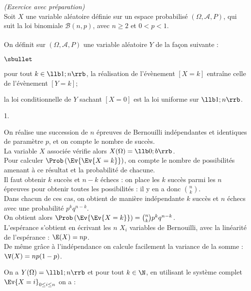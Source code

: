 \documentclass[11pt]{article}%
\begin{document}
 \newpage

 \begin{exercice}{\it (Exercice avec préparation)}~\\
 Soit $X$ une variable aléatoire définie sur un espace probabilisé
$(\Omega, \mathcal{A}, P)$, qui suit la loi binomiale $\mathcal{B} (n,
p)$, avec $n \geq 2$ et $0 < p < 1$. \\
\\
 On définit sur $(\Omega, \mathcal{A}, P)$ une variable aléatoire $Y$
de la façon suivante : \\
 \begin{noliste}{$\sbullet$}
 \item pour tout $k \in \llb 1 ; n \rrb$, la réalisation de l'évènement
$[X = k]$ entraîne celle de l'évènement $[Y = k]$;
 \item la loi conditionnelle de $Y$ sachant $[X = 0]$ est la loi
uniforme sur $\llb 1 ; n \rrb$.
 \end{noliste}
 \begin{noliste}{1.}
 \setlength{\itemsep}{4mm}
 \item On réalise une succession de $n$ épreuves de Bernouilli
indépendantes et identiques de paramètre $p$, et on compte le nombre de
succès. \\
 La variable $X$ associée vérifie alors $X(\Omega) = \llb 0 ; b \rrb$.
\\
 Pour calculer $\Prob\left(\Ev{\Ev{X = k}}\right)$, on compte le nombre
de possibilités amenant à ce résultat et la probabilité de chacune. \\
 Il faut obtenir $k$ succès et $n-k$ échecs : on place les $k$ succès
parmi les $n$ épreuves pour obtenir toutes les possibilités : il y en a
donc $\binom{n}{k}$. \\
 Dans chacun de ces cas, on obtient de manière indépendante $k$ succès
et $n$ échecs avec une probabilité $p^{k} q^{n-k}$. \\
 On obtient alors $\Prob\left(\Ev{\Ev{X = k}}\right) = \binom{n}{k}
p^{k} q^{n-k}$. \\
 L'espérance s'obtient en écrivant les $n$ $X_{i}$ variables de
Bernouilli, avec la linéarité de l'espérance : $\E(X) = n p$. \\
 De même grâce à l'indépendance on calcule facilement la variance de la
somme : $\V(X) = n p (1-p)$. \\
 \item On a $Y (\Omega ) = \llb 1 ; n \rrb$ et pour tout $k \in \N$, en
utilisant le système complet $\Ev{X = i}_{0 \leq i \leq n}$ on a : \\

\end{noliste}
\end{exercice}
\end{document}
